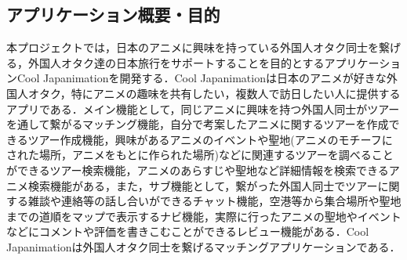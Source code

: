 \subsection{アプリケーション概要・目的}
\par
本プロジェクトでは，日本のアニメに興味を持っている外国人オタク同士を繋げる，外国人オタク達の日本旅行をサポートすることを目的とするアプリケーションCool Japanimationを開発する．Cool Japanimationは日本のアニメが好きな外国人オタク，特にアニメの趣味を共有したい，複数人で訪日したい人に提供するアプリである．メイン機能として，同じアニメに興味を持つ外国人同士がツアーを通して繋がるマッチング機能，自分で考案したアニメに関するツアーを作成できるツアー作成機能，興味があるアニメのイベントや聖地(アニメのモチーフにされた場所，アニメをもとに作られた場所)などに関連するツアーを調べることができるツアー検索機能，アニメのあらすじや聖地など詳細情報を検索できるアニメ検索機能がある，また，サブ機能として，繋がった外国人同士でツアーに関する雑談や連絡等の話し合いができるチャット機能，空港等から集合場所や聖地までの道順をマップで表示するナビ機能，実際に行ったアニメの聖地やイベントなどにコメントや評価を書きこむことができるレビュー機能がある．Cool Japanimationは外国人オタク同士を繋げるマッチングアプリケーションである．
